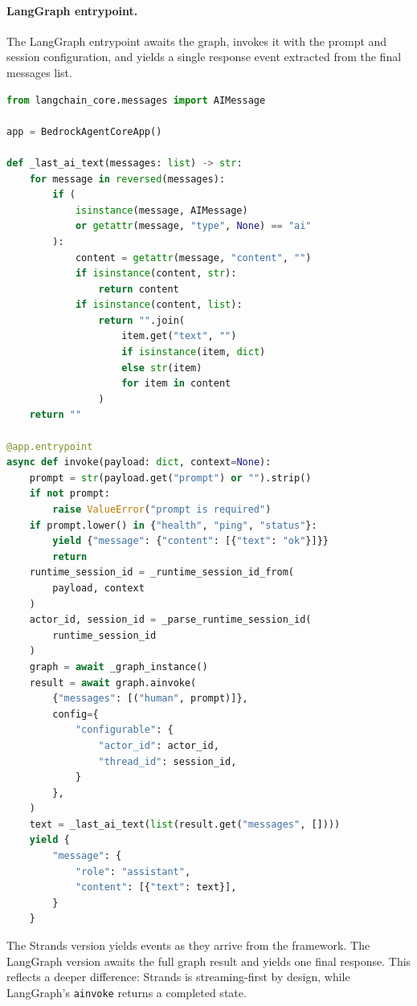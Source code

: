 \paragraph{LangGraph entrypoint.}

The LangGraph entrypoint awaits the graph, invokes it with the prompt and session
configuration, and yields a single response event extracted from the final messages list.

\begin{lstlisting}[language=Python]
from langchain_core.messages import AIMessage

app = BedrockAgentCoreApp()

def _last_ai_text(messages: list) -> str:
    for message in reversed(messages):
        if (
            isinstance(message, AIMessage)
            or getattr(message, "type", None) == "ai"
        ):
            content = getattr(message, "content", "")
            if isinstance(content, str):
                return content
            if isinstance(content, list):
                return "".join(
                    item.get("text", "")
                    if isinstance(item, dict)
                    else str(item)
                    for item in content
                )
    return ""

@app.entrypoint
async def invoke(payload: dict, context=None):
    prompt = str(payload.get("prompt") or "").strip()
    if not prompt:
        raise ValueError("prompt is required")
    if prompt.lower() in {"health", "ping", "status"}:
        yield {"message": {"content": [{"text": "ok"}]}}
        return
    runtime_session_id = _runtime_session_id_from(
        payload, context
    )
    actor_id, session_id = _parse_runtime_session_id(
        runtime_session_id
    )
    graph = await _graph_instance()
    result = await graph.ainvoke(
        {"messages": [("human", prompt)]},
        config={
            "configurable": {
                "actor_id": actor_id,
                "thread_id": session_id,
            }
        },
    )
    text = _last_ai_text(list(result.get("messages", [])))
    yield {
        "message": {
            "role": "assistant",
            "content": [{"text": text}],
        }
    }
\end{lstlisting}

The Strands version yields events as they arrive from the framework. The LangGraph version
awaits the full graph result and yields one final response. This reflects a deeper
difference: Strands is streaming-first by design, while LangGraph's \texttt{ainvoke}
returns a completed state.

